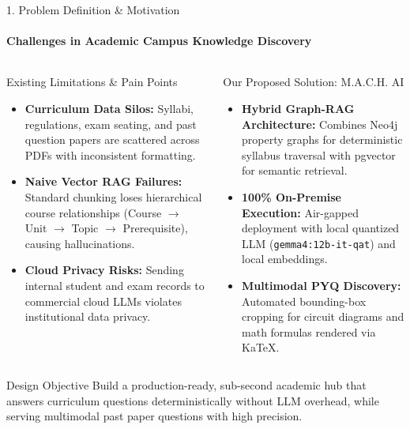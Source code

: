 \documentclass[aspectratio=169, 11pt]{beamer}
\begin{document}
\begin{frame}{1. Problem Definition \& Motivation}
    \framesubtitle{Challenges in Academic Campus Knowledge Discovery}
    \begin{columns}[T]
        \begin{block}{Existing Limitations \& Pain Points}
            \footnotesize
            \begin{itemize}
                \item \textbf{Curriculum Data Silos:} Syllabi, regulations, exam seating, and past question papers are scattered across PDFs with inconsistent formatting.
                \item \textbf{Naive Vector RAG Failures:} Standard chunking loses hierarchical course relationships (Course $\rightarrow$ Unit $\rightarrow$ Topic $\rightarrow$ Prerequisite), causing hallucinations.
                \item \textbf{Cloud Privacy Risks:} Sending internal student and exam records to commercial cloud LLMs violates institutional data privacy.
            \end{itemize}
        \end{block}

        \begin{block}{Our Proposed Solution: M.A.C.H. AI}
            \footnotesize
            \begin{itemize}
                \item \textbf{Hybrid Graph-RAG Architecture:} Combines Neo4j property graphs for deterministic syllabus traversal with pgvector for semantic retrieval.
                \item \textbf{100\% On-Premise Execution:} Air-gapped deployment with local quantized LLM (\texttt{gemma4:12b-it-qat}) and local embeddings.
                \item \textbf{Multimodal PYQ Discovery:} Automated bounding-box cropping for circuit diagrams and math formulas rendered via KaTeX.
            \end{itemize}
        \end{block}
    \end{columns}
    \vspace{0.15cm}
    \begin{alertblock}{Design Objective}
        \scriptsize
        Build a production-ready, sub-second academic hub that answers curriculum questions deterministically without LLM overhead, while serving multimodal past paper questions with high precision.
    \end{alertblock}
\end{frame}
\end{document}
